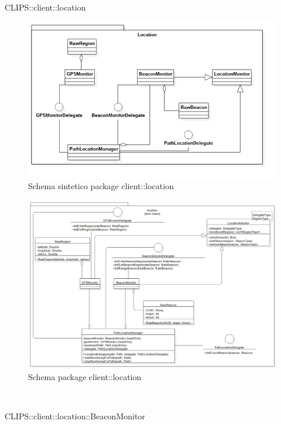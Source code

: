 \begin{componente}{CLIPS::client::location}
\begin{figure}[h!]
	\centering
	\includegraphics[scale=0.45]{img/package/png/client--location--min.png}
	\caption{Schema sintetico package client::location}
\end{figure}
\begin{figure}[h!]
\centering
\includegraphics[scale=0.5]{img/package/png/client--location.png}
\caption{Schema package client::location}
 \end{figure}
\begin{compClassi} \\
\begin{classe}{CLIPS::client::location::BeaconMonitor}

\end{classe}
\end{compClassi}
\end{componente}
